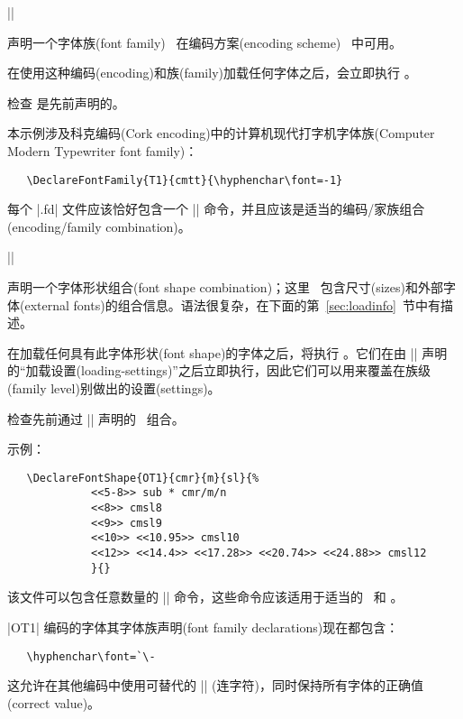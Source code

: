\documentclass{ltxguide}[1995/11/28]
\begin{document}
\begin{decl}
  |\DeclareFontFamily|   
\end{decl}

声明一个字体族(font family) \ 在编码方案(encoding scheme) \ 中可用。

在使用这种编码(encoding)和族(family)加载任何字体之后，会立即执行  。

检查  是先前声明的。

本示例涉及科克编码(Cork encoding)中的计算机现代打字机字体族(Computer Modern Typewriter font family)：
\begin{verbatim}
   \DeclareFontFamily{T1}{cmtt}{\hyphenchar\font=-1}
\end{verbatim}

每个 |.fd| 文件应该恰好包含一个 |\DeclareFontFamily| 命令，并且应该是适当的编码/家族组合(encoding/family combination)。

\begin{decl}
|\DeclareFontShape|   
                    \\
        \null\hfill {} 
\end{decl}

声明一个字体形状组合(font shape combination)；这里 \ 包含尺寸(sizes)和外部字体(external fonts)的组合信息。语法很复杂，在下面的第~\ref{sec:loadinfo}~节中有描述。

在加载任何具有此字体形状(font shape)的字体之后，将执行 。它们在由 |\DeclareFontFamily| 声明的“加载设置(loading-settings)”之后立即执行，因此它们可以用来覆盖在族级(family level)别做出的设置(settings)。

检查先前通过 |\DeclareFontFamily| 声明的 \ 组合。

示例：
\begin{verbatim}
   \DeclareFontShape{OT1}{cmr}{m}{sl}{%
             <<5-8>> sub * cmr/m/n
             <<8>> cmsl8
             <<9>> cmsl9
             <<10>> <<10.95>> cmsl10
             <<12>> <<14.4>> <<17.28>> <<20.74>> <<24.88>> cmsl12
             }{}
\end{verbatim}
该文件可以包含任意数量的 |\DeclareFontShape| 命令，这些命令应该适用于适当的 \ 和 。

|OT1| 编码的字体其字体族声明(font family declarations)现在都包含：
\begin{verbatim}
   \hyphenchar\font=`\-
\end{verbatim}
这允许在其他编码中使用可替代的 |\hyphenchar| (连字符)，同时保持所有字体的正确值(correct value)。
\end{document}
